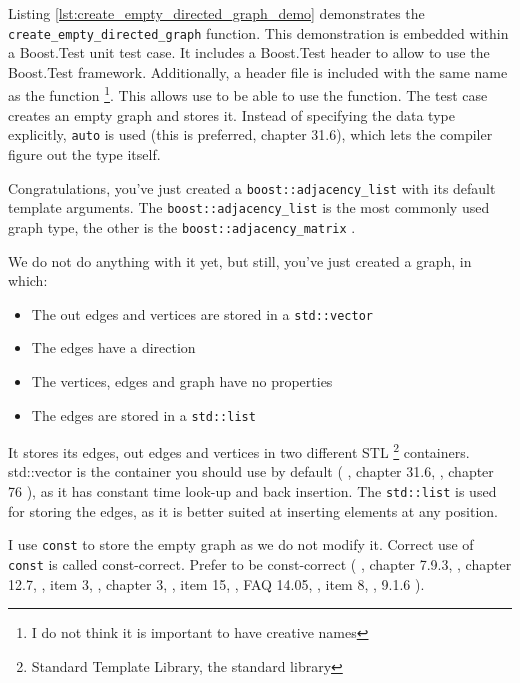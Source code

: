 Listing \ref{lst:create_empty_directed_graph_demo}
demonstrates the \verb;create_empty_directed_graph; function.
This demonstration is embedded within a Boost.Test unit test case.
It includes a Boost.Test header to allow to use the Boost.Test framework.
Additionally, a header file is included with the same name as the function
\footnote{
  I do not think it is important to have creative names
}.
This allows use to be able to use the function.
The test case creates an empty graph and stores it.
Instead of specifying the data type explicitly, 
\verb;auto;  is used (this is preferred, \cite{stroustrup2013}
chapter 31.6), which lets the compiler figure out the type itself.



Congratulations, you've just created a 
\verb;boost::adjacency_list; 
with its default template arguments.
The \verb;boost::adjacency_list; is the most commonly used graph type, the other
is the \verb;boost::adjacency_matrix; .

We do not do anything with it yet, but still, you've just created a graph,
in which:

\begin{itemize}
  \item The out edges and vertices are stored in a \verb;std::vector; 
  \item The edges have a direction
  \item The vertices, edges and graph have no properties
  \item The edges are stored in a \verb;std::list; 
\end{itemize}

It stores its edges, out edges and vertices in two different STL 
\footnote{
  Standard Template Library, the standard library
}
containers.
std::vector  is the container you should use by default (
  \cite{stroustrup2013}, chapter 31.6, 
  \cite{sutter_and_alexandrescu2004}, chapter 76
), as it has constant time look-up and back insertion.
The \verb;std::list; 
is used for storing the edges, as it is better suited at inserting elements
at any position.

I use \verb;const;  to store the empty graph as we do not modify it.
Correct use of \verb;const; is called const-correct.
Prefer to be const-correct 
(
  \cite{stroustrup1997}, chapter 7.9.3, 
  \cite{stroustrup2013}, chapter 12.7, 
  \cite{meyers2005effective}, item 3, 
  \cite{hollingworth2000cpp_builder_dev_guide}, chapter 3, 
  \cite{sutter_and_alexandrescu2004}, item 15, 
  \cite{cline1998cpp_faqs}, FAQ 14.05, 
  \cite{eckel2002thinking_cpp}, item 8, 
  \cite{lakos1996large}, 9.1.6
).

